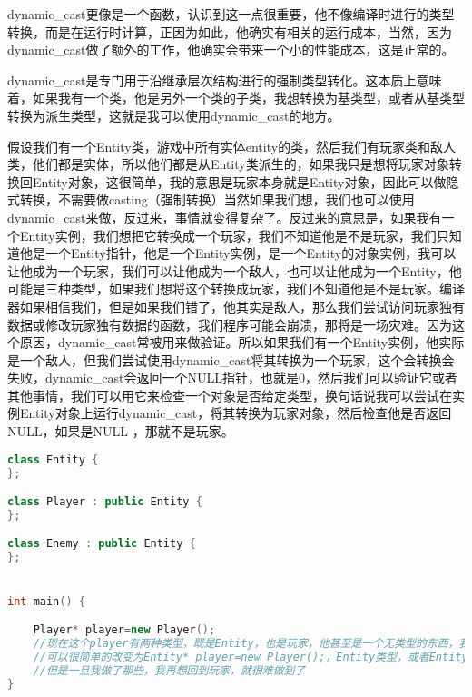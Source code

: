 {\ncodestyle dynamic_cast}更像是一个函数，认识到这一点很重要，他不像编译时进行的类型转换，而是在运行时计算，正因为如此，他确实有相关的运行成本，当然，因为{\ncodestyle dynamic_cast}做了额外的工作，他确实会带来一个小的性能成本，这是正常的。

{\ncodestyle dynamic_cast}是专门用于沿继承层次结构进行的强制类型转化。这本质上意味着，如果我有一个类，他是另外一个类的子类，我想转换为基类型，或者从基类型转换为派生类型，这就是我可以使用{\ncodestyle dynamic_cast}的地方。

假设我们有一个{\ncodestyle Entity}类，游戏中所有实体{\ncodestyle entity}的类，然后我们有玩家类和敌人类，他们都是实体，所以他们都是从{\ncodestyle Entity}类派生的，如果我只是想将玩家对象转换回{\ncodestyle Entity}对象，这很简单，我的意思是玩家本身就是{\ncodestyle Entity}对象，因此可以做隐式转换，不需要做{\ncodestyle casting}（强制转换）当然如果我们想，我们也可以使用{\ncodestyle dynamic_cast}来做，反过来，事情就变得复杂了。反过来的意思是，如果我有一个{\ncodestyle Entity}实例，我们想把它转换成一个玩家，我们不知道他是不是玩家，我们只知道他是一个{\ncodestyle Entity}指针，他是一个{\ncodestyle Entity}实例，是一个{\ncodestyle Entity}的对象实例，我可以让他成为一个玩家，我们可以让他成为一个敌人，也可以让他成为一个{\ncodestyle Entity}，他可能是三种类型，如果我们想将这个转换成玩家，我们不知道他是不是玩家。编译器如果相信我们，但是如果我们错了，他其实是敌人，那么我们尝试访问玩家独有数据或修改玩家独有数据的函数，我们程序可能会崩溃，那将是一场灾难。因为这个原因，{\ncodestyle dynamic_cast}常被用来做验证。所以如果我们有一个{\ncodestyle Entity}实例，他实际是一个敌人，但我们尝试使用{\ncodestyle dynamic_cast}将其转换为一个玩家，这个会转换会失败，{\ncodestyle dynamic_cast}会返回一个{\ncodestyle NULL}指针，也就是0，然后我们可以验证它或者其他事情，我们可以用它来检查一个对象是否给定类型，换句话说我可以尝试在实例{\ncodestyle Entity}对象上运行{\ncodestyle dynamic_cast}，将其转换为玩家对象，然后检查他是否返回NULL，如果是{\ncodestyle NULL} ，那就不是玩家。

\begin{lstlisting}[language=c++]
class Entity {
};

class Player : public Entity {
};

class Enemy : public Entity {
};


int main() {

    Player* player=new Player();
    //现在这个player有两种类型，既是Entity，也是玩家，他甚至是一个无类型的东西，我们以后可能会讲到
    //可以很简单的改变为Entity* player=new Player();，Entity类型，或者Entity* e = player隐式转换
    //但是一旦我做了那些，我再想回到玩家，就很难做到了
}
\end{lstlisting}

